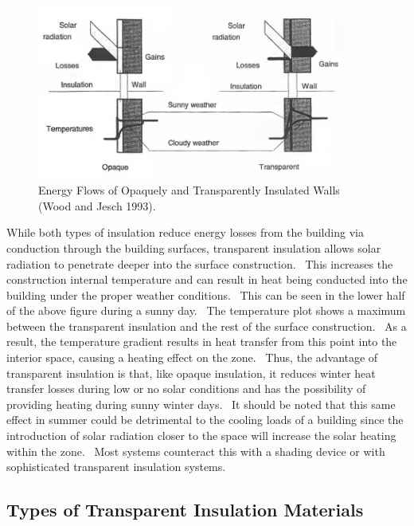 \begin{figure}[hbtp] %
\centering
\includegraphics[width=0.9\textwidth, height=0.9\textheight, keepaspectratio=true]{media/image399.png}
\caption{  Energy Flows of Opaquely and Transparently Insulated Walls (Wood and Jesch 1993). \protect \label{fig:energy-flows-of-opaquely-and-transparently}}
\end{figure}

While both types of insulation reduce energy losses from the building via conduction through the building surfaces, transparent insulation allows solar radiation to penetrate deeper into the surface construction.~ This increases the construction internal temperature and can result in heat being conducted into the building under the proper weather conditions.~ This can be seen in the lower half of the above figure during a sunny day.~ The temperature plot shows a maximum between the transparent insulation and the rest of the surface construction.~ As a result, the temperature gradient results in heat transfer from this point into the interior space, causing a heating effect on the zone.~ Thus, the advantage of transparent insulation is that, like opaque insulation, it reduces winter heat transfer losses during low or no solar conditions and has the possibility of providing heating during sunny winter days.~ It should be noted that this same effect in summer could be detrimental to the cooling loads of a building since the introduction of solar radiation closer to the space will increase the solar heating within the zone.~ Most systems counteract this with a shading device or with sophisticated transparent insulation systems.

\subsection{Types of Transparent Insulation Materials}\label{types-of-transparent-insulation-materials}

